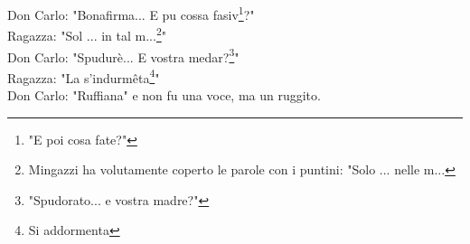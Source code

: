 Don Carlo: "Bonafirma... E pu cossa fasiv\footnote{"E poi cosa fate?"}?"\\
Ragazza: "Sol ... in tal m...\footnote{Mingazzi ha volutamente coperto le parole con i puntini: "Solo ... nelle m...}"\\
Don Carlo: "Spudurè... E vostra medar?\footnote{"Spudorato... e vostra madre?"}"\\
Ragazza: "La s'indurmêta\footnote{Si addormenta}"\\
Don Carlo: "Ruffiana" e non fu una voce, ma un ruggito.\\
